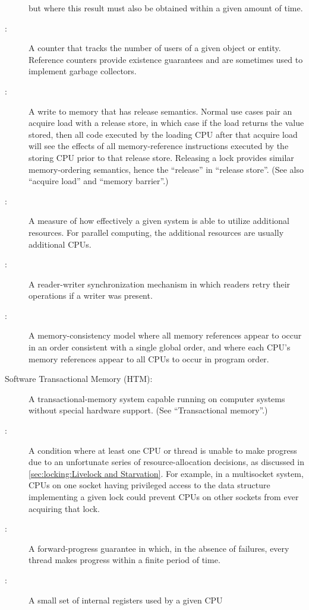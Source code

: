 \begin{description}
	but where this result must also be obtained within a given amount
	of time.
\item[\IXG{Reference Count}:]
	A counter that tracks the number of users of a given object or
	entity.
	Reference counters provide existence guarantees and are sometimes
	used to implement garbage collectors.
\item[\IXG{Release Store}:]
	A write to memory that has release semantics.
	Normal use cases pair an acquire load with a release store,
	in which case if the load returns the value stored, then all
	code executed by the loading CPU after that acquire load will
	see the effects of all memory-reference instructions executed
	by the storing CPU prior to that release store.
	Releasing a lock provides similar memory-ordering semantics,
	hence the ``release'' in ``release store''.
	(See also ``acquire load'' and ``memory barrier''.)
\item[\IXG{Scalability}:]
	A measure of how effectively a given system is able to utilize
	additional resources.
	For parallel computing, the additional resources are usually
	additional CPUs.
\item[\IXGh{Sequence}{Lock}:]
	A reader-writer synchronization mechanism in which readers
	retry their operations if a writer was present.
\item[\IXGh{Sequential}{Consistency}:]
	A memory-consistency model where all memory references appear to occur
	in an order consistent with
	a single global order, and where each CPU's memory references
	appear to all CPUs to occur in program order.
\item[Software Transactional Memory (HTM):]
	A transactional-memory system capable running on computer systems
	without special hardware support.
	(See ``Transactional memory''.)
\item[\IXG{Starvation}:]
	A condition where at least one CPU or thread is unable to make
	progress due to an unfortunate series of resource-allocation
	decisions, as discussed in
	\cref{sec:locking:Livelock and Starvation}.
	For example, in a multisocket system, CPUs on one socket having
	privileged access to the data structure implementing a given lock
	could prevent CPUs on other sockets from ever acquiring that lock.
\item[\IXG{Starvation Free}:]
	A forward-progress guarantee in which, in the absence of
	failures, every thread makes progress within a finite
	period of time.
\item[\IXG{Store Buffer}:]
	A small set of internal registers used by a given CPU

\end{description}
